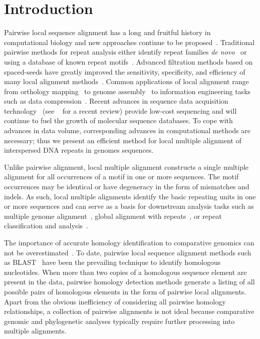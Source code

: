 \documentclass[12pt,journal,letterpaper,onecolumn, draftcls]{IEEEtran}
\begin{document}
\section{Introduction}
Pairwise local sequence alignment has a long and fruitful history in computational biology and new approaches continue to be proposed~\cite{ref-pattern,ref-chaos,ref-yass,ref-kahveciMAP}. Traditional pairwise methods for repeat analysis either identify repeat families \textit{de novo}~\cite{ref-reputer} or using a database of known repeat motifs~\cite{ref-repbase}. Advanced filtration methods based on spaced-seeds have greatly improved the sensitivity, specificity, and efficiency of many local alignment methods~\cite{ref-zhang04,ref-zhang06,ref-buhler05,ref-xu04,ref-batzoglouNAR, ref-rasmussen}. Common applications of local alignment range from orthology mapping~\cite{ref-orthomcl} to genome assembly~\cite{ref-arachne2} to information engineering tasks such as data compression~\cite{ref-ane}. Recent advances in sequence data acquisition technology~\cite{ref-454, sequencing, hybrid} (see ~\cite{ref-nextgenseq} for a recent review) provide low-cost sequencing and will continue to fuel the growth of molecular sequence databases. To cope with advances in data volume, corresponding advances in computational methods are necessary; thus we present an efficient method for local multiple alignment of interspersed DNA repeats in genomes sequences.

Unlike pairwise alignment, local multiple alignment constructs a single multiple alignment for all occurrences of a motif in one or more sequences.  The motif occurrences may be identical or have degeneracy in the form of mismatches and indels.  As such, local multiple alignments identify the basic repeating units in one or
more sequences and can serve as a basis for downstream analysis tasks such as multiple genome alignment~\cite{ref-mauve,ref-mga,ref-mgcat,ref-deweyReview}, global alignment with repeats~\cite{ref-otherSammethPaper,ref-aba}, or repeat classification and analysis~\cite{ref-piler}.

The importance of accurate homology identification to comparative genomics can not be overestimated~\cite{Kumar07}. To date, pairwise local sequence alignment methods such as BLAST~\cite{ref-blastz,ref-ssearch} have been the prevailing technique to identify homologous nucleotides. When more than two copies of a homologous sequence element are present in the data, pairwise homology detection methods generate a listing of all possible pairs of homologous elements in the form of pairwise local alignments.  Apart from the obvious inefficiency of considering all pairwise homology relationships, a collection of pairwise alignments is not ideal because comparative genomic and phylogenetic analyses typically require further processing into multiple alignments.
\end{document}
